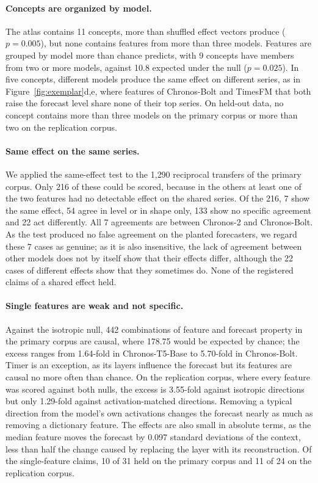 \documentclass[twoside,11pt]{article}
\begin{document}
\paragraph{Concepts are organized by model.}
\label{sec:bymodel}
The atlas contains 11 concepts, more than shuffled effect vectors produce ($p=0.005$), but none contains features from more than three models.
Features are grouped by model more than chance predicts, with 9 concepts have members from two or more models, against 10.8 expected under the null ($p=0.025$).
In five concepts, different models produce the same effect on different series, as in Figure~\ref{fig:exemplar}d,e, where features of Chronos-Bolt and TimesFM that both raise the forecast level share none of their top series.
On held-out data, no concept contains more than three models on the primary corpus or more than two on the replication corpus.

\paragraph{Same effect on the same series.}
\label{sec:sameeffect}
We applied the same-effect test to the 1{,}290 reciprocal transfers of the primary corpus.
Only 216 of these could be scored, because in the others at least one of the two features had no detectable effect on the shared series.
Of the 216, 7 show the same effect, 54 agree in level or in shape only, 133 show no specific agreement and 22 act differently.
All 7 agreements are between Chronos-2 and Chronos-Bolt.
As the test produced no false agreement on the planted forecasters, we regard these 7 cases as genuine; as it is also insensitive, the lack of agreement between other models does not by itself show that their effects differ, although the 22 cases of different effects show that they sometimes do.
None of the registered claims of a shared effect held.

\paragraph{Single features are weak and not specific.}
\label{sec:specificity}
Against the isotropic null, 442 combinations of feature and forecast property in the primary corpus are causal, where 178.75 would be expected by chance; the excess ranges from 1.64-fold in Chronos-T5-Base to 5.70-fold in Chronos-Bolt.
Timer is an exception, as its layers influence the forecast but its features are causal no more often than chance.
On the replication corpus, where every feature was scored against both nulls, the excess is 3.55-fold against isotropic directions but only 1.29-fold against activation-matched directions.
Removing a typical direction from the model's own activations changes the forecast nearly as much as removing a dictionary feature.
The effects are also small in absolute terms, as the median feature moves the forecast by 0.097 standard deviations of the context, less than half the change caused by replacing the layer with its reconstruction.
Of the single-feature claims, 10 of 31 held on the primary corpus and 11 of 24 on the replication corpus.
\end{document}
